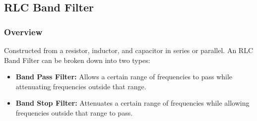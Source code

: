 \subsection{RLC Band Filter}

\subsubsection{Overview}
Constructed from a resistor, inductor, and capacitor in series
or parallel. An RLC Band Filter can be broken down into two types:
\begin{itemize}
  \item \textbf{Band Pass Filter:} Allows a certain range of
    frequencies to pass while attenuating frequencies outside
    that range.
  \item \textbf{Band Stop Filter:} Attenuates a certain range of
    frequencies while allowing frequencies outside that range
    to pass.
\end{itemize}

